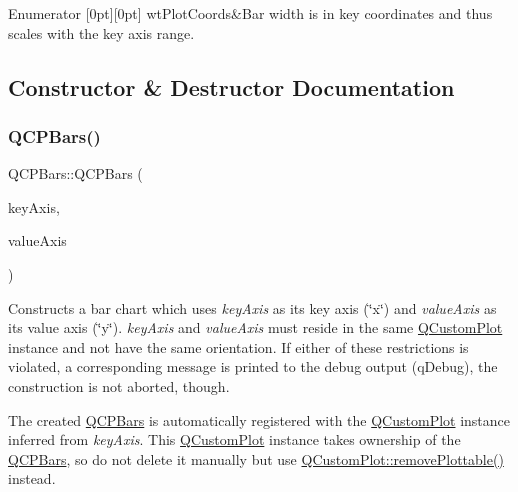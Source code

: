 \begin{DoxyEnumFields}{Enumerator}
[0pt][0pt]{}\mbox{\label{class_q_c_p_bars_a65dbbf1ab41cbe993d71521096ed4649a67f08c8d84085b506a42e7d85d14589a}} 
wt\+Plot\+Coords&Bar width is in key coordinates and thus scales with the key axis range. \\
\hline

\end{DoxyEnumFields}


\subsection{Constructor \& Destructor Documentation}
\mbox{\label{class_q_c_p_bars_a64006999ad9dff308f40df41cef176ad}} 
\subsubsection{\texorpdfstring{Q\+C\+P\+Bars()}{QCPBars()}}
{\footnotesize\ttfamily Q\+C\+P\+Bars\+::\+Q\+C\+P\+Bars (\begin{DoxyParamCaption}\item[{\hyperlink{class_q_c_p_axis}{Q\+C\+P\+Axis} $\ast$}]{key\+Axis,  }\item[{\hyperlink{class_q_c_p_axis}{Q\+C\+P\+Axis} $\ast$}]{value\+Axis }\end{DoxyParamCaption})\hspace{0.3cm}{\ttfamily [explicit]}}

Constructs a bar chart which uses {\itshape key\+Axis} as its key axis (\char`\"{}x\char`\"{}) and {\itshape value\+Axis} as its value axis (\char`\"{}y\char`\"{}). {\itshape key\+Axis} and {\itshape value\+Axis} must reside in the same \hyperlink{class_q_custom_plot}{Q\+Custom\+Plot} instance and not have the same orientation. If either of these restrictions is violated, a corresponding message is printed to the debug output (q\+Debug), the construction is not aborted, though.

The created \hyperlink{class_q_c_p_bars}{Q\+C\+P\+Bars} is automatically registered with the \hyperlink{class_q_custom_plot}{Q\+Custom\+Plot} instance inferred from {\itshape key\+Axis}. This \hyperlink{class_q_custom_plot}{Q\+Custom\+Plot} instance takes ownership of the \hyperlink{class_q_c_p_bars}{Q\+C\+P\+Bars}, so do not delete it manually but use \hyperlink{class_q_custom_plot_af3dafd56884208474f311d6226513ab2}{Q\+Custom\+Plot\+::remove\+Plottable()} instead. 

